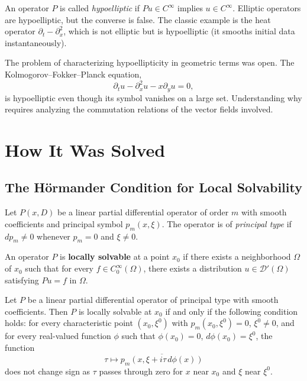 An operator \(P\) is called \textit{hypoelliptic} if \(Pu \in C^\infty\)
implies \(u \in C^\infty\). Elliptic operators are hypoelliptic, but the
converse is false. The classic example is the heat operator
\(\partial_t - \partial_x^2\), which is not elliptic but is hypoelliptic
(it smooths initial data instantaneously).

The problem of characterizing hypoellipticity in geometric terms was
open. The Kolmogorov--Fokker--Planck equation,
\[
\partial_t u - \partial_x^2 u - x \partial_y u = 0,
\]
is hypoelliptic even though its symbol vanishes on a large set.
Understanding why requires analyzing the commutation relations of the
vector fields involved.

\section{How It Was Solved}

\subsection{The H\"ormander Condition for Local Solvability}

Let \(P(x,D)\) be a linear partial differential operator of order \(m\)
with smooth coefficients and principal symbol \(p_m(x,\xi)\). The
operator is of \textit{principal type} if \(dp_m \neq 0\) whenever
\(p_m = 0\) and \(\xi \neq 0\).

\begin{definition}
An operator \(P\) is \textbf{locally solvable} at a point \(x_0\) if
there exists a neighborhood \(\Omega\) of \(x_0\) such that for every
\(f \in C_0^\infty(\Omega)\), there exists a distribution
\(u \in \mathcal{D}'(\Omega)\) satisfying \(Pu = f\) in \(\Omega\).
\end{definition}

\begin{theorem}
Let \(P\) be a linear partial differential operator of principal type
with smooth coefficients. Then \(P\) is locally solvable at \(x_0\) if
and only if the following condition holds: for every characteristic
point \((x_0, \xi^0)\) with \(p_m(x_0, \xi^0) = 0\), \(\xi^0 \neq 0\),
and for every real-valued function \(\phi\) such that \(\phi(x_0) = 0\),
\(d\phi(x_0) = \xi^0\), the function
\[
\tau \mapsto \overline{p_m(x, \xi + i\tau\,d\phi(x))}
\]
does not change sign as \(\tau\) passes through zero for \(x\) near
\(x_0\) and \(\xi\) near \(\xi^0\).
\end{theorem}

